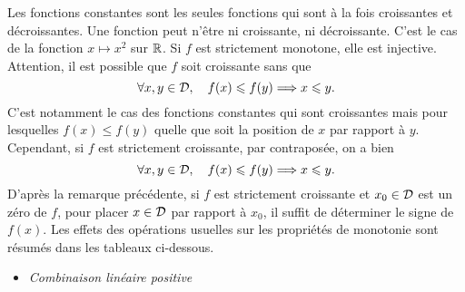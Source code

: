 \documentclass{magnoliaold}
\begin{document}
\begin{remarques}
\remarque Les fonctions constantes sont les seules fonctions qui sont à la fois croissantes et décroissantes.
\remarque Une fonction peut n'être ni croissante, ni décroissante. C'est le cas de la fonction $x\mapsto x^2$ sur $\mathbb{R}$.
\remarque Si $f$ est strictement monotone, elle est injective.
\remarque Attention, il est possible que $f$ soit croissante sans que
  \[\forall x,y\in\mathcal{D} ,\quad f(x)\leqslant f(y) \Longrightarrow x\leqslant y.\]
  C'est notamment le cas des fonctions constantes qui sont croissantes mais
  pour lesquelles $f(x)\leq f(y)$ quelle que soit la position de $x$ par rapport à $y$.
  Cependant, si $f$ est strictement croissante, par contraposée, on a bien
  \[\forall x,y\in\mathcal{D} ,\quad f(x)\leqslant f(y) \Longrightarrow x\leqslant y.\]
\remarque D'après la remarque précédente, si $f$ est strictement croissante et $x_0\in\mathcal{D}$ est un zéro de $f$, pour placer $x\in\mathcal{D}$ par rapport à $x_0$, il suffit de déterminer le signe de $f(x)$.
  \remarque
Les effets des opérations usuelles sur les propriétés de monotonie sont résumés
dans les tableaux ci-dessous.
\begin{itemize}
\item \emph{Combinaison linéaire positive}
  \begin{center}
  \begin{tabular}{|c|c|c|}

\end{tabular}
\end{center}
\end{itemize}
\end{remarques}
\end{document}
